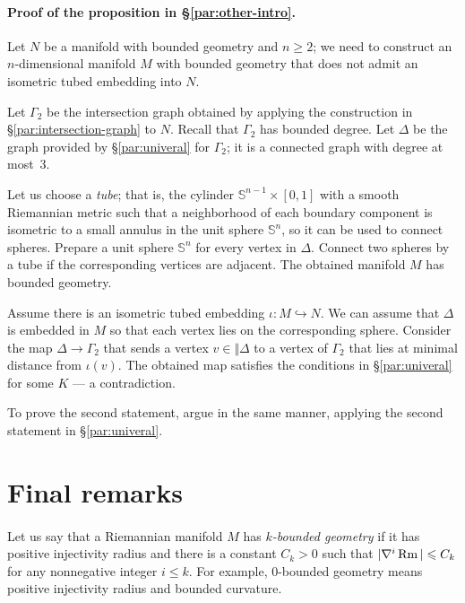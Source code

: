 \arxiv{\documentclass[a4paper,10pt]{article}}{\documentclass{mjm}}
\begin{document}
\paragraph{Proof of the proposition in §\ref{par:other-intro}.}\label{par:other-proof}
Let $N$ be a manifold with bounded geometry and $n\ge 2$;
we need to construct an $n$-dimensional manifold $M$ with bounded geometry that does not admit an isometric tubed embedding into $N$.

Let $\Gamma_2$ be the intersection graph obtained by applying the construction in §\ref{par:intersection-graph} to $N$.
Recall that $\Gamma_2$ has bounded degree.
Let $\Delta$ be the graph provided by §\ref{par:univeral} for $\Gamma_2$;
it is a connected graph with  degree at most~3.

Let us choose a \emph{tube}; that is, the cylinder $\mathbb{S}^{n-1}\times [0,1]$ with a smooth Riemannian metric such that a neighborhood of each boundary component is isometric to a small annulus in the unit sphere $\mathbb{S}^n$, so it can be used to connect spheres.
Prepare a unit sphere $\mathbb{S}^n$ for every vertex in $\Delta$.
Connect two spheres by a tube if the corresponding vertices are adjacent.
The obtained manifold $M$ has bounded geometry.

Assume there is an isometric tubed embedding $\iota\colon M\hookrightarrow N$.
We can assume that $\Delta$ is embedded in $M$ so that each vertex lies on the corresponding sphere.
Consider the map $\Delta\to \Gamma_2$ that sends a vertex $v\in \Vert \Delta$ to a vertex of $\Gamma_2$ that lies at minimal distance from $\iota(v)$.
The obtained map satisfies the conditions in §\ref{par:univeral} for some $K$ --- a contradiction.

To prove the second statement, argue in the same manner, applying the second statement in §\ref{par:univeral}.
\qeds





\section*{Final remarks}


\paragraph{}\label{par:remarks}
Let us say that a Riemannian manifold $M$ has \emph{$k$-bounded geometry} if it has positive injectivity radius and there is a constant $C_k > 0$ such that $|\nabla^i \operatorname{\rm Rm}| \leqslant C_k$ for any nonnegative integer $i\le k$.
For example, $0$-bounded geometry means positive injectivity radius and bounded curvature.
\end{document}
